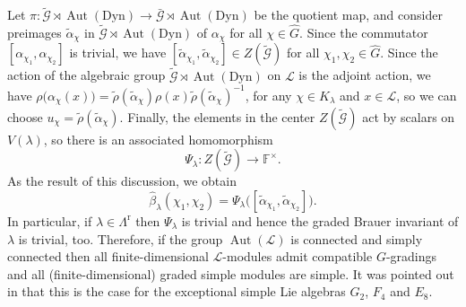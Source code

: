 \documentclass[a4paper,reqno]{amsart}
\theoremstyle{definition}
\numberwithin{theorem}{section}
\numberwithin{equation}{section}
\begin{document}
Let $\pi\colon\tilde{\mathcal{G}}\rtimes\operatorname{\mathrm{Aut}}(\mathrm{Dyn})\rightarrow \bar{\mathcal{G}}\rtimes\operatorname{\mathrm{Aut}}(\mathrm{Dyn})$ be the quotient map, and consider preimages $\tilde\alpha_\chi$ in $\tilde{\mathcal{G}}\rtimes\operatorname{\mathrm{Aut}}(\mathrm{Dyn})$ of $\alpha_\chi$ for all $\chi\in\widehat{G}$. Since the commutator $[\alpha_{\chi_1},\alpha_{\chi_2}]$ is trivial, we have $[\tilde\alpha_{\chi_1},\tilde\alpha_{\chi_2}]\in Z(\tilde{\mathcal{G}})$ for all $\chi_1,\chi_2\in\widehat{G}$.
Since the action of the algebraic group $\tilde{\mathcal{G}}\rtimes\operatorname{\mathrm{Aut}}(\mathrm{Dyn})$ on ${\mathcal{L}}$ is the adjoint action, we have 
$\rho\bigl(\alpha_\chi(x)\bigr)=\tilde\rho(\tilde\alpha_\chi)\rho(x)\tilde\rho(\tilde\alpha_\chi)^{-1}$,
for any $\chi\in K_\lambda$ and $x\in{\mathcal{L}}$, so we can choose $u_\chi=\tilde{\rho}(\tilde{\alpha}_\chi)$. 
Finally, the elements in the center $Z(\tilde{\mathcal{G}})$ act by scalars on $V(\lambda)$, so there is an associated homomorphism 
\[
\Psi_\lambda\colon Z(\tilde{\mathcal{G}})\rightarrow {\mathbb{F}}^\times.
\] 
As the result of this discussion, we obtain
\begin{equation}\label{eq:new}
\hat{\beta}_\lambda(\chi_1,\chi_2)=\Psi_\lambda\bigl([\tilde\alpha_{\chi_1},\tilde\alpha_{\chi_2}]\bigr).
\end{equation}
In particular, if $\lambda\in\Lambda^\mathrm{r}$ then $\Psi_\lambda$ is trivial and hence the graded Brauer invariant of $\lambda$ is trivial, too. Therefore, if the group $\operatorname{\mathrm{Aut}}({\mathcal{L}})$ is connected and simply connected then all finite-dimensional ${\mathcal{L}}$-modules admit compatible $G$-gradings and all (finite-dimensional) graded simple  modules are simple. It was pointed out in \cite{EK_D4} that this is the case for the exceptional simple Lie algebras $G_2$, $F_4$ and $E_8$.
\end{document}
